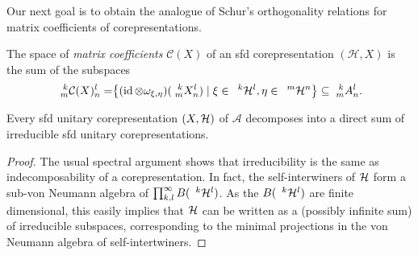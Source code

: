 Our next goal is to obtain the analogue of Schur's orthogonality
relations for matrix coefficients of corepresentations.

\begin{Def} The space of \emph{matrix coefficients} $\mathcal{C}(X)$ of an sfd corepresentation $(\mathcal{H},X)$ is the sum of
the subspaces
\begin{align*}
  \Gr{\mathcal{C}(X)}{k}{l}{m}{n} &= \span \left\{ (\id \otimes
  \omega_{\xi,\eta})(\Gr{X}{k}{l}{m}{n}) \mid \xi \in
  \Gru{\mathcal{H}}{k}{l}, \eta \in \Gru{\mathcal{H}}{m}{n} \right\}
\subseteq \Gr{A}{k}{l}{m}{n}.
\end{align*}
\end{Def}

\begin{Lem} Every sfd unitary corepresentation $(X,\mathcal{H})$ of $\mathscr{A}$ decomposes into a direct sum of irreducible sfd unitary corepresentations.
\end{Lem} 
\begin{proof} The usual spectral argument shows that irreducibility is the same as indecomposability of a corepresentation. In fact, the self-interwiners of $\mathcal{H}$ form a sub-von Neumann algebra of $\prod_{k,l}^{\infty} B(\;{}^{\;k}\mathcal{H}^{l})$. As the $B(\;{}^{\;k}\mathcal{H}^{l})$ are finite dimensional, this easily implies that $\mathcal{H}$ can be written as a (possibly infinite sum) of irreducible subspaces, corresponding to the minimal projections in the von Neumann algebra of self-intertwiners.%
\end{proof} 

